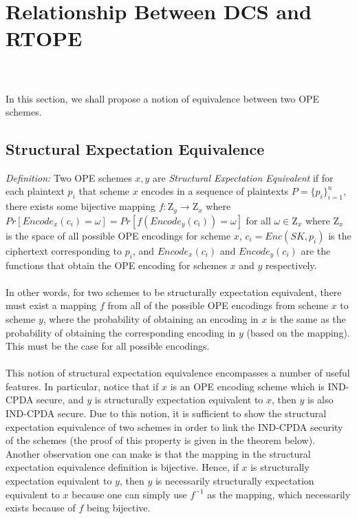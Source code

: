 \documentclass[12pt]{article}
\begin{document}
\section{Relationship Between DCS and RTOPE} \\ \\In this section, we shall propose a notion of equivalence between two OPE schemes.
  \subsection{Structural Expectation Equivalence} 
  \emph{Definition:} Two OPE schemes $x,y$ are \emph{Structural Expectation Equivalent} if for each plaintext $p_i$ that scheme $x$ encodes in a sequence of plaintexts $P = \{p_i\}_{i=1}^n$, there exists some bijective mapping $f: \mathrm{Z}_y \to \mathrm{Z}_x$ where $Pr[Encode_x(c_i) = \omega] = Pr[f(Encode_y(c_i)) = \omega]$ for all $\omega \in \mathrm{Z}_x$ where $\mathrm{Z}_x$ is the space of all possible OPE encodings for scheme $x$, $c_i = Enc(SK, p_i)$ is the ciphertext corresponding to $p_i$, and $Encode_x(c_i)$ and $Encode_y(c_i)$ are the functions that obtain the OPE encoding for schemes $x$ and $y$ respectively. \\ \\ 
In other words, for two schemes to be structurally expectation equivalent, there must exist a mapping $f$ from all of the possible OPE encodings from scheme $x$ to scheme $y$, where the probability of obtaining an encoding in $x$ is the same as the probability of obtaining the corresponding encoding in $y$ (based on the mapping). This must be the case for all possible encodings. \\ \\
This notion of structural expectation equivalence encompasses a number of useful features. In particular, notice that if $x$ is an OPE encoding scheme which is IND-CPDA secure, and $y$ is structurally expectation equivalent to $x$, then $y$ is also IND-CPDA secure. Due to this notion, it is sufficient to show the structural expectation equivalence of two schemes in order to link the IND-CPDA security of the schemes (the proof of this property is given in the theorem below). Another observation one can make is that the mapping in the structural expectation equivalence definition is bijective. Hence, if $x$ is structurally expectation equivalent to $y$, then $y$ is necessarily structurally expectation equivalent to $x$ because one can simply use $f^{-1}$ as the mapping, which necessarily exists because of $f$ being bijective.
\end{document}
